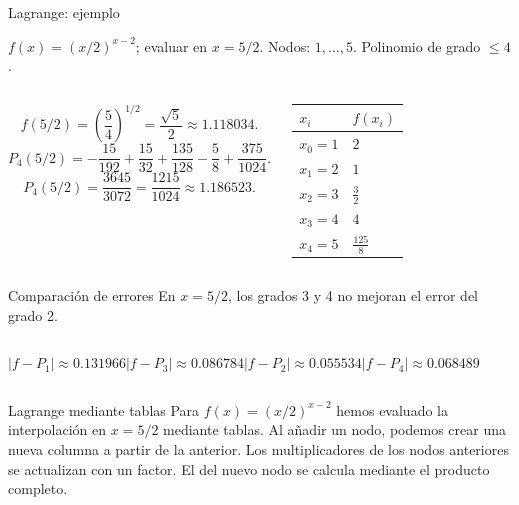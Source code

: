 \documentclass[original_version/main.tex]{subfiles}
\begin{document}
\begin{frame}[t]{Lagrange: ejemplo}
\par\noindent\begin{minipage}[t][7.5mm][t]{\textwidth}\small\strut $f(x)=(x/2)^{x-2}$; evaluar en $x=5/2$. Nodos: $1,\ldots,5$. Polinomio de grado $\le 4$.\end{minipage}\par\nointerlineskip
\begin{columns}[T]\small\setlength{\abovedisplayskip}{4pt}\setlength{\belowdisplayskip}{4pt}\[f(5/2)=\left(\frac54\right)^{1/2}=\frac{\sqrt5}{2}\approx1.118034.\]\scriptsize\[P_4(5/2)=-\frac{15}{192}+\frac{15}{32}+\frac{135}{128}-\frac58+\frac{375}{1024}.\]\[P_4(5/2)=\frac{3645}{3072}=\frac{1215}{1024}\approx1.186523.\]\begingroup\small\setlength{\tabcolsep}{3pt}\begin{center}\begin{tabular}{|C{.42\textwidth}|C{.42\textwidth}|}\hline
\rule[-2mm]{0pt}{6mm}$x_i$&$f(x_i)$\\\hline
\rule[-2.5mm]{0pt}{6mm}$x_0=1$&$2$\\\hline
\rule[-2.5mm]{0pt}{6mm}$x_1=2$&$1$\\\hline
\rule[-2.5mm]{0pt}{6mm}$x_2=3$&$\frac{3}{2}$\\\hline
\rule[-2.5mm]{0pt}{6mm}$x_3=4$&$4$\\\hline
\rule[-2.5mm]{0pt}{6mm}$x_4=5$&$\frac{125}{8}$\\\hline
\end{tabular}\end{center}\endgroup\par
\end{columns}
\end{frame}
\begin{frame}[t]{Comparación de errores}
\small En $x=5/2$, los grados 3 y 4 no mejoran el error del grado 2.
\begin{columns}\centering $|f-P_1|\approx0.131966$\centering $|f-P_3|\approx0.086784$\centering $|f-P_2|\approx0.055534$\centering $|f-P_4|\approx0.068489$\end{columns}
\end{frame}
\begin{frame}[t]{Lagrange mediante tablas}
Para $f(x)=(x/2)^{x-2}$ hemos evaluado la interpolación en $x=5/2$ mediante tablas.
\bigskip
Al añadir un nodo, podemos crear una nueva columna a partir de la anterior.
\bigskip
Los multiplicadores de los nodos anteriores se actualizan con un factor. El del nuevo nodo se calcula mediante el producto completo.
\end{frame}
\end{document}
